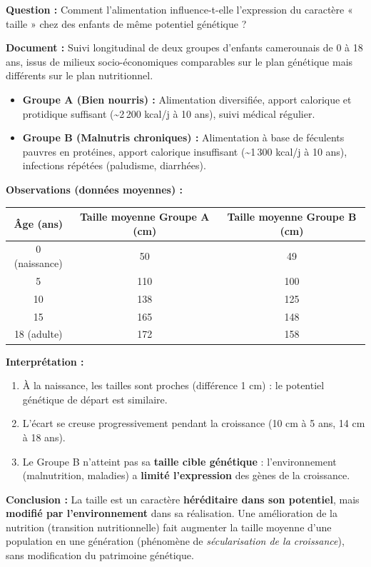 \documentclass[11pt]{article}
\begin{document}
\begin{experience}
\textbf{Question :} Comment l'alimentation influence-t-elle l'expression du caractère « taille » chez des enfants de même potentiel génétique ?
\par\textbf{Document :} Suivi longitudinal de deux groupes d'enfants camerounais de 0 à 18 ans, issus de milieux socio-économiques comparables sur le plan génétique mais différents sur le plan nutritionnel.
\begin{itemize}
    \item \textbf{Groupe A (Bien nourris) :} Alimentation diversifiée, apport calorique et protidique suffisant (\textasciitilde 2\,200 kcal/j à 10 ans), suivi médical régulier.
    \item \textbf{Groupe B (Malnutris chroniques) :} Alimentation à base de féculents pauvres en protéines, apport calorique insuffisant (\textasciitilde 1\,300 kcal/j à 10 ans), infections répétées (paludisme, diarrhées).
\end{itemize}
\par\textbf{Observations (données moyennes) :}
\begin{center}
\begin{tabular}{|c|c|c|}\hline
\textbf{Âge (ans)} & \textbf{Taille moyenne Groupe A (cm)} & \textbf{Taille moyenne Groupe B (cm)} \\ \hline
0 (naissance) & 50 & 49 \\ \hline
5 & 110 & 100 \\ \hline
10 & 138 & 125 \\ \hline
15 & 165 & 148 \\ \hline
18 (adulte) & 172 & 158 \\ \hline
\end{tabular}
\end{center}
\par\textbf{Interprétation :}
\begin{enumerate}
    \item À la naissance, les tailles sont proches (différence 1 cm) : le potentiel génétique de départ est similaire.
    \item L'écart se creuse progressivement pendant la croissance (10 cm à 5 ans, 14 cm à 18 ans).
    \item Le Groupe B n'atteint pas sa \textbf{taille cible génétique} : l'environnement (malnutrition, maladies) a \textbf{limité l'expression} des gènes de la croissance.
\end{enumerate}
\par\textbf{Conclusion :} La taille est un caractère \textbf{héréditaire dans son potentiel}, mais \textbf{modifié par l'environnement} dans sa réalisation. Une amélioration de la nutrition (transition nutritionnelle) fait augmenter la taille moyenne d'une population en une génération (phénomène de \emph{sécularisation de la croissance}), sans modification du patrimoine génétique.
\end{experience}
\end{document}
